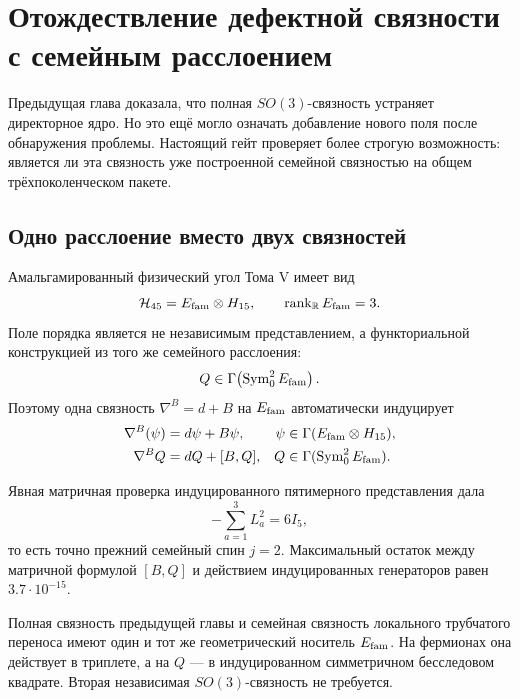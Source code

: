 \chapter{Отождествление дефектной связности с семейным расслоением}

Предыдущая глава доказала, что полная $SO(3)$-связность устраняет
директорное ядро. Но это ещё могло означать добавление нового поля после
обнаружения проблемы. Настоящий гейт проверяет более строгую возможность:
является ли эта связность уже построенной семейной связностью на общем
трёхпоколенческом пакете.

\section{Одно расслоение вместо двух связностей}

Амальгамированный физический угол Тома V имеет вид
\begin{equation}
 \mathcal H_{45}=E_{\rm fam}\otimes H_{15},
 \qquad \operatorname{rank}_{\mathbb R}E_{\rm fam}=3.
 \label{eq:v6-family-bundle-h45}
\end{equation}
Поле порядка является не независимым представлением, а функториальной
конструкцией из того же семейного расслоения:
\begin{equation}
 Q\in\Gamma\!\left(\operatorname{Sym}^2_0E_{\rm fam}\right).
 \label{eq:v6-Q-induced-family-bundle}
\end{equation}
Поэтому одна связность $\nabla^B=d+B$ на $E_{\rm fam}$ автоматически
индуцирует
\begin{align}
 \nabla^B(\psi)&=d\psi+B\psi,
 &\psi&\in\Gamma(E_{\rm fam}\otimes H_{15}),
 \label{eq:v6-family-fermion-connection}\\
 \nabla^B Q&=dQ+[B,Q],
 &Q&\in\Gamma(\operatorname{Sym}^2_0E_{\rm fam}).
 \label{eq:v6-family-Q-connection}
\end{align}

Явная матричная проверка индуцированного пятимерного представления дала
\begin{equation}
 -\sum_{a=1}^3L_a^2=6I_5,
\end{equation}
то есть точно прежний семейный спин $j=2$. Максимальный остаток между
матричной формулой $[B,Q]$ и действием индуцированных генераторов равен
$3.7\cdot10^{-15}$.

\begin{proposition}
Полная связность предыдущей главы и семейная связность локального
трубчатого переноса имеют один и тот же геометрический носитель
$E_{\rm fam}$. На фермионах она действует в триплете, а на $Q$ --- в
индуцированном симметричном бесследовом квадрате. Вторая независимая
$SO(3)$-связность не требуется.
\end{proposition}

